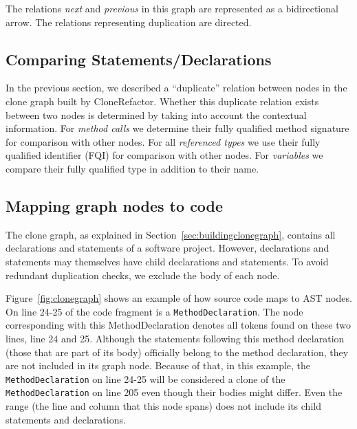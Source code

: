 \documentclass[journal]{IEEEtran}
\begin{document}

The relations \textit{next} and \textit{previous} in this graph are represented as a bidirectional arrow. The relations representing duplication are directed. %

\subsection{Comparing Statements/Declarations} \label{sec:comparingstuff}
In the previous section, we described a ``duplicate'' relation between nodes in the clone graph built by CloneRefactor. Whether this duplicate relation exists between two nodes is determined by taking into account the contextual information. For \textit{method calls} we determine their fully qualified method signature for comparison with other nodes. For all \textit{referenced types} we use their fully qualified identifier (FQI) for comparison with other nodes. For \textit{variables} we compare their fully qualified type in addition to their name.

\subsection{Mapping graph nodes to code}
The clone graph, as explained in Section~\ref{sec:buildingclonegraph}, contains all declarations and statements of a software project. However, declarations and statements may themselves have child declarations and statements. To avoid redundant duplication checks, we exclude the body of each node.

Figure~\ref{fig:clonegraph} shows an example of how source code maps to AST nodes. On line 24-25 of the code fragment is a \texttt{MethodDeclaration}. The node corresponding with this MethodDeclaration denotes all tokens found on these two lines, line 24 and 25. Although the statements following this method declaration (those that are part of its body) officially belong to the method declaration, they are not included in its graph node. Because of that, in this example, the \texttt{MethodDeclaration} on line 24-25 will be considered a clone of the \texttt{MethodDeclaration} on line 205 even though their bodies might differ. Even the range (the line and column that this node spans) does not include its child statements and declarations.
\end{document}

